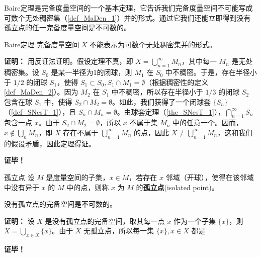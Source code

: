 
Baire定理是完备度量空间的一个基本定理，它告诉我们完备度量空间不可能写成可数个无处稠密集（\autoref{def_MaDen_1}）并的形式。通过它我们还能立即得到没有孤立点的任一完备度量空间是不可数的。

\begin{theorem}{Baire定理}
完备度量空间 $X$ 不能表示为可数个无处稠密集并的形式。
\end{theorem}
\textbf{证明：}
用反证法证明。假设定理不真，即 $X=\bigcup_{n=1}^\infty M_n$，其中每一 $M_n$ 是无处稠密集。设 $S_0$ 是某一半径为1的闭球，则 $M_1$ 在 $S_0$ 中不稠密。于是，存在半径小于 $1/2$ 的闭球 $S_1$，使得 $S_1\subset S_0,S_1\cap M_1=\emptyset$（根据稠密性的定义\autoref{def_MaDen_2}）。因为 $M_2$ 在 $S_1$ 中不稠密，所以存在半径小于 $1/3$ 的闭球 $S_2$ 包含在球 $S_1$ 中，使得 $S_2\cap M_2=\emptyset$。如此，我们获得了一个闭球套 $\{S_n\}$ （\autoref{def_SNesT_1}），且 $S_n\cap M_n=\emptyset$。由球套定理（\autoref{the_SNesT_1}），$\bigcap_{n=1}^\infty S_n$ 包含一点 $x$。由于 $S_2\cap M_2=\emptyset$，所以 $x$ 不属于集 $M_n$ 中的任意一个。因而，$x\notin \bigcup\limits_n M_n$，即 $X$ 存在不属于 $\bigcup_{n=1}^\infty M_n$ 的点，因此 $X\neq\bigcup_{n=1}^\infty M_n$，这和我们的假设矛盾，因此定理得证。

\textbf{证毕！}


\begin{definition}{孤立点}
设 $M$ 是度量空间的子集，$x\in M$，若存在 $x$ 邻域（开球），使得在该邻域中没有异于 $x$ 的 $M$ 中的点，则称 $x$ 为 $M$ 的\textbf{孤立点}(isolated point)。
\end{definition}

\begin{corollary}{}
没有孤立点的完备空间是不可数的。
\end{corollary}

\textbf{证明：}
设 $X$ 是没有孤立点的完备空间，取其每一点 $x$ 作为一个子集 $\{x\}$，则 $X=\bigcup\limits_{x\in X}\{x\}$。由于 $X$ 无孤立点，所以每一集 $\{x\},x\in X$ 都是 

\textbf{证毕！}



